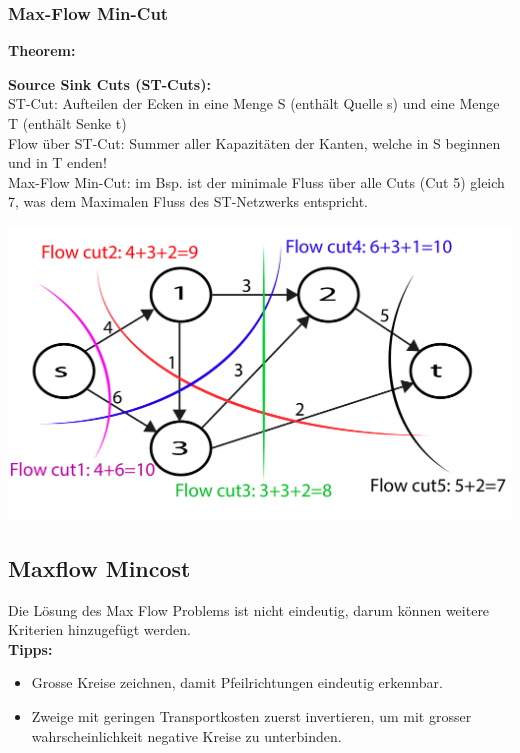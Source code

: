 \subsubsection{Max-Flow Min-Cut}
\textbf{Theorem:} 

\begin{minipage}{0.6\textwidth}
	\textbf{Source Sink Cuts (ST-Cuts):}\\
	
	ST-Cut: Aufteilen der Ecken in eine Menge S (enthält Quelle s) und eine Menge T (enthält Senke t)\\
	
	Flow über ST-Cut: Summer aller Kapazitäten der Kanten, welche in S beginnen und in T enden!\\
	
	Max-Flow Min-Cut: im Bsp. ist der minimale Fluss über alle Cuts (Cut 5) gleich 7, was dem Maximalen Fluss des ST-Netzwerks entspricht. 
\end{minipage}
\begin{minipage}{0.4\textwidth}
	\includegraphics[width=\textwidth]{Content/Graphen/StCuts.pdf}
\end{minipage}


\newpage
\subsection{Maxflow Mincost}
Die Lösung des Max Flow Problems ist nicht eindeutig, darum können weitere Kriterien hinzugefügt werden.\\

\textbf{Tipps:}
\begin{itemize}
\item Grosse Kreise zeichnen, damit Pfeilrichtungen eindeutig erkennbar.
\item Zweige mit geringen Transportkosten zuerst invertieren, um mit grosser wahrscheinlichkeit negative Kreise zu unterbinden.
\end{itemize} 


